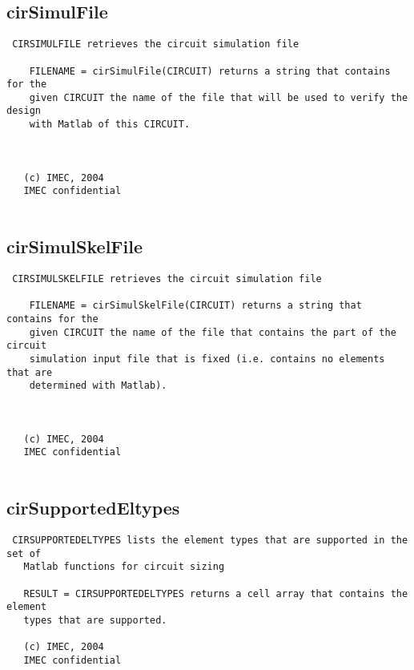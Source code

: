 \newpage
\subsection{cirSimulFile}
\label{sec:cirSimulFile}
\begin{verbatim}
 CIRSIMULFILE retrieves the circuit simulation file
 
    FILENAME = cirSimulFile(CIRCUIT) returns a string that contains for the
    given CIRCUIT the name of the file that will be used to verify the design
    with Matlab of this CIRCUIT.
 
 
 
   (c) IMEC, 2004
   IMEC confidential 
 

\end{verbatim}

\newpage
\subsection{cirSimulSkelFile}
\label{sec:cirSimulSkelFile}
\begin{verbatim}
 CIRSIMULSKELFILE retrieves the circuit simulation file
 
    FILENAME = cirSimulSkelFile(CIRCUIT) returns a string that contains for the
    given CIRCUIT the name of the file that contains the part of the circuit
    simulation input file that is fixed (i.e. contains no elements that are
    determined with Matlab).
 
 
 
   (c) IMEC, 2004
   IMEC confidential 
 

\end{verbatim}

\newpage
\subsection{cirSupportedEltypes}
\label{sec:cirSupportedEltypes}
\begin{verbatim}
 CIRSUPPORTEDELTYPES lists the element types that are supported in the set of
   Matlab functions for circuit sizing
 
   RESULT = CIRSUPPORTEDELTYPES returns a cell array that contains the element
   types that are supported.
 
   (c) IMEC, 2004
   IMEC confidential 
 

\end{verbatim}

